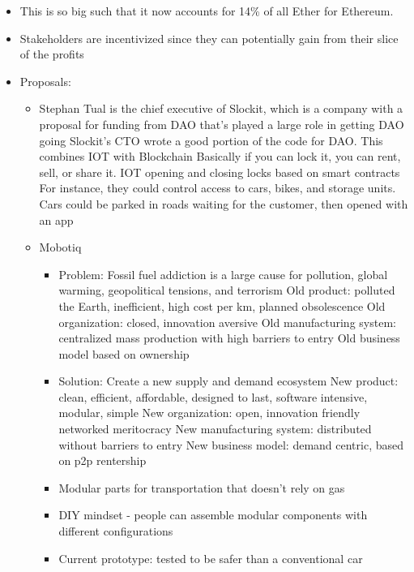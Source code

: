 \documentclass{article}
\begin{document}
\begin{itemize}
\begin{itemize}
    \end{itemize}
  \item This is so big such that it now accounts for 14\% of all Ether for Ethereum.
  \item Stakeholders are incentivized since they can potentially gain from their slice of the profits
  \item Proposals:
    \begin{itemize}
      \item Stephan Tual is the chief executive of Slockit, which is a company with a proposal for funding from DAO that's played a large role
        in getting DAO going
        \subitem Slockit's CTO wrote a good portion of the code for DAO. This combines IOT with Blockchain
        \subitem Basically if you can lock it, you can rent, sell, or share it. 
        \subitem IOT opening and closing locks based on smart contracts
        \subitem For instance, they could control access to cars, bikes, and storage units. 
        \subitem Cars could be parked in roads waiting for the customer, then opened with an app
    \end{itemize}
    \begin{itemize}
      \item Mobotiq
        \begin{itemize}
          \item Problem: Fossil fuel addiction is a large cause for pollution, global warming, geopolitical tensions, and terrorism
            \subitem Old product: polluted the Earth, inefficient, high cost per km, planned obsolescence
            \subitem Old organization: closed, innovation aversive
            \subitem Old manufacturing system: centralized mass production with high barriers to entry
            \subitem Old business model based on ownership
          \item Solution: Create a new supply and demand ecosystem
            \subitem New product: clean, efficient, affordable, designed to last, software intensive, modular, simple
            \subitem New organization: open, innovation friendly networked meritocracy
            \subitem New manufacturing system: distributed without barriers to entry
            \subitem New business model: demand centric, based on p2p rentership
          \item Modular parts for transportation that doesn't rely on gas
          \item DIY  mindset - people can assemble modular components with different configurations
          \item Current prototype: tested to be safer than a conventional car

\end{itemize}
\end{itemize}
\end{itemize}
\end{document}

